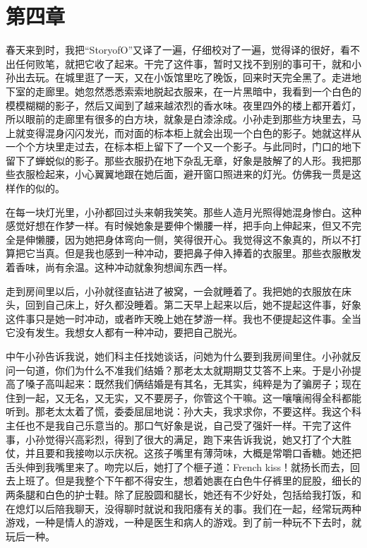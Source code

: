 \section{第四章}

春天来到时，我把“StoryofO”又译了一遍，仔细校对了一遍，觉得译的很好，看不出任何败笔，就把它收了起来。干完了这件事，暂时又找不到别的事可干，就和小孙出去玩。在城里逛了一天，又在小饭馆里吃了晚饭，回来时天完全黑了。走进地下室的走廊里。她忽然悉悉索索地脱起衣服来，在一片黑暗中，我看到一个白色的模模糊糊的影子，然后又闻到了越来越浓烈的香水味。夜里四外的楼上都开着灯，所以眼前的走廊里有很多的白方块，就象是白漆涂成。小孙走到那些方块里去，马上就变得混身闪闪发光，而对面的标本柜上就会出现一个白色的影子。她就这样从一个个方块里走过去，在标本柜上留下了一个又一个影子。与此同时，门口的地下留下了蝉蜕似的影子。那些衣服扔在地下杂乱无章，好象是肢解了的人形。我把那些衣服检起来，小心翼翼地跟在她后面，避开窗口照进来的灯光。仿佛我一贯是这样作的似的。 

在每一块灯光里，小孙都回过头来朝我笑笑。那些人造月光照得她混身惨白。这种感觉好想在作梦一样。有时候她象是要伸个懒腰一样，把手向上伸起来，但又不完全是伸懒腰，因为她把身体弯向一侧，笑得很开心。我觉得这不象真的，所以不打算把它当真。但是我也感到一种冲动，要把鼻子伸入捧着的衣服里。那些衣服散发着香味，尚有余温。这种冲动就象狗想闻东西一样。 

走到房间里以后，小孙就径直钻进了被窝，一会就睡着了。我把她的衣服放在床头，回到自己床上，好久都没睡着。第二天早上起来以后，她不提起这件事，好象这件事只是她一时冲动，或者昨天晚上她在梦游一样。我也不便提起这件事。全当它没有发生。我想女人都有一种冲动，要把自己脱光。 

中午小孙告诉我说，她们科主任找她谈话，问她为什么要到我房间里住。小孙就反问一句道，你们为什么不准我们结婚？那老太太就期期艾艾答不上来。于是小孙提高了嗓子高叫起来：既然我们俩结婚是有其名，无其实，纯粹是为了骗房子；现在住到一起，又无名，又无实，又不要房子，你管这个干嘛。这一嚷嚷闹得全科都能听到。那老太太着了慌，委委屈屈地说：孙大夫，我求求你，不要这样。我这个科主任也不是我自己乐意当的。那口气好象是说，自己受了强奸一样。干完了这件事，小孙觉得兴高彩烈，得到了很大的满足，跑下来告诉我说，她又打了个大胜仗，并且要和我接吻以示庆祝。这孩子嘴里有薄菏味，大概是常嚼口香糖。她还把舌头伸到我嘴里来了。吻完以后，她打了个榧子道：French kiss！就扬长而去，回去上班了。但是我整个下午都不得安生，想着她裹在白色牛仔裤里的屁股，细长的两条腿和白色的护士鞋。除了屁股圆和腿长，她还有不少好处，包括给我打饭，和在熄灯以后陪我聊天，没得聊时就说和我阳痿有关的事。我们在一起，经常玩两种游戏，一种是情人的游戏，一种是医生和病人的游戏。到了前一种玩不下去时，就玩后一种。 

